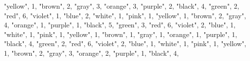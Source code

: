 \documentclass[
]{article}
\newenvironment{Shaded}{\begin{snugshade}}{\end{snugshade}}
\newcommand{\DecValTok}[1]{\textcolor[rgb]{0.00,0.00,0.81}{#1}}
\newcommand{\NormalTok}[1]{#1}
\newcommand{\StringTok}[1]{\textcolor[rgb]{0.31,0.60,0.02}{#1}}
\begin{document}
\begin{Shaded}
\begin{Highlighting}[]
  \StringTok{"yellow"}\NormalTok{, }\DecValTok{1}\NormalTok{,}
  \StringTok{"brown"}\NormalTok{, }\DecValTok{2}\NormalTok{,}
  \StringTok{"gray"}\NormalTok{, }\DecValTok{3}\NormalTok{,}
  \StringTok{"orange"}\NormalTok{, }\DecValTok{3}\NormalTok{,}
  \StringTok{"purple"}\NormalTok{, }\DecValTok{2}\NormalTok{,}
    \StringTok{"black"}\NormalTok{, }\DecValTok{4}\NormalTok{,}
  \StringTok{"green"}\NormalTok{, }\DecValTok{2}\NormalTok{,}
  \StringTok{"red"}\NormalTok{, }\DecValTok{6}\NormalTok{,}
  \StringTok{"violet"}\NormalTok{, }\DecValTok{1}\NormalTok{,}
  \StringTok{"blue"}\NormalTok{, }\DecValTok{2}\NormalTok{,}
  \StringTok{"white"}\NormalTok{, }\DecValTok{1}\NormalTok{,}
  \StringTok{"pink"}\NormalTok{, }\DecValTok{1}\NormalTok{,}
  \StringTok{"yellow"}\NormalTok{, }\DecValTok{1}\NormalTok{,}
  \StringTok{"brown"}\NormalTok{, }\DecValTok{2}\NormalTok{,}
  \StringTok{"gray"}\NormalTok{, }\DecValTok{4}\NormalTok{,}
  \StringTok{"orange"}\NormalTok{, }\DecValTok{1}\NormalTok{,}
  \StringTok{"purple"}\NormalTok{, }\DecValTok{1}\NormalTok{,}
    \StringTok{"black"}\NormalTok{, }\DecValTok{5}\NormalTok{,}
  \StringTok{"green"}\NormalTok{, }\DecValTok{3}\NormalTok{,}
  \StringTok{"red"}\NormalTok{, }\DecValTok{6}\NormalTok{,}
  \StringTok{"violet"}\NormalTok{, }\DecValTok{2}\NormalTok{,}
  \StringTok{"blue"}\NormalTok{, }\DecValTok{1}\NormalTok{,}
  \StringTok{"white"}\NormalTok{, }\DecValTok{1}\NormalTok{,}
  \StringTok{"pink"}\NormalTok{, }\DecValTok{1}\NormalTok{,}
  \StringTok{"yellow"}\NormalTok{, }\DecValTok{1}\NormalTok{,}
  \StringTok{"brown"}\NormalTok{, }\DecValTok{1}\NormalTok{,}
  \StringTok{"gray"}\NormalTok{, }\DecValTok{1}\NormalTok{,}
  \StringTok{"orange"}\NormalTok{, }\DecValTok{1}\NormalTok{,}
  \StringTok{"purple"}\NormalTok{, }\DecValTok{1}\NormalTok{,}
    \StringTok{"black"}\NormalTok{, }\DecValTok{4}\NormalTok{,}
  \StringTok{"green"}\NormalTok{, }\DecValTok{2}\NormalTok{,}
  \StringTok{"red"}\NormalTok{, }\DecValTok{6}\NormalTok{,}
  \StringTok{"violet"}\NormalTok{, }\DecValTok{2}\NormalTok{,}
  \StringTok{"blue"}\NormalTok{, }\DecValTok{1}\NormalTok{,}
  \StringTok{"white"}\NormalTok{, }\DecValTok{1}\NormalTok{,}
  \StringTok{"pink"}\NormalTok{, }\DecValTok{1}\NormalTok{,}
  \StringTok{"yellow"}\NormalTok{, }\DecValTok{1}\NormalTok{,}
  \StringTok{"brown"}\NormalTok{, }\DecValTok{2}\NormalTok{,}
  \StringTok{"gray"}\NormalTok{, }\DecValTok{3}\NormalTok{,}
  \StringTok{"orange"}\NormalTok{, }\DecValTok{2}\NormalTok{,}
  \StringTok{"purple"}\NormalTok{, }\DecValTok{1}\NormalTok{,}
    \StringTok{"black"}\NormalTok{, }\DecValTok{4}\NormalTok{,}

\end{Highlighting}
\end{Shaded}
\end{document}
